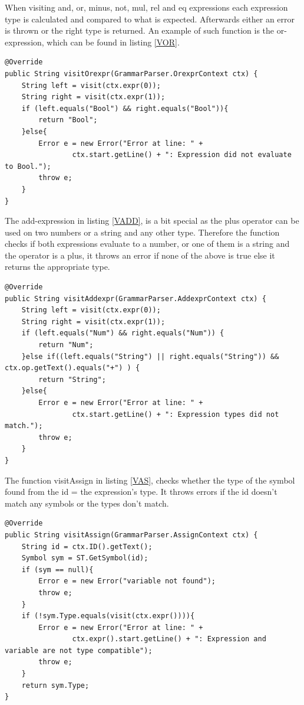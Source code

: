 When visiting and, or, minus, not, mul, rel and eq expressions each expression type is calculated and compared to what is expected. Afterwards either an error is thrown or the right type is returned. An example of such function is the or-expression, which can be found in listing \ref{VOR}.

\begin{lstlisting}[caption={SymbolTypeVisitor - visitOrexpr function}, label={VOR}]
@Override
public String visitOrexpr(GrammarParser.OrexprContext ctx) {
    String left = visit(ctx.expr(0));
    String right = visit(ctx.expr(1));
    if (left.equals("Bool") && right.equals("Bool")){
        return "Bool";
    }else{
        Error e = new Error("Error at line: " +
                ctx.start.getLine() + ": Expression did not evaluate to Bool.");
        throw e;
    }
}
\end{lstlisting}

The add-expression in listing \ref{VADD}, is a bit special as the plus operator can be used on two numbers or a string and any other type. Therefore the function checks if both expressions evaluate to a number, or one of them is a string and the operator is a plus, it throws an error if none of the above is true else it returns the appropriate type. 

\begin{lstlisting}[caption={SymbolTypeVisitor - visitAddexpr function}, label={VADD}]
@Override
public String visitAddexpr(GrammarParser.AddexprContext ctx) {
    String left = visit(ctx.expr(0));
    String right = visit(ctx.expr(1));
    if (left.equals("Num") && right.equals("Num")) {
        return "Num";
    }else if((left.equals("String") || right.equals("String")) && ctx.op.getText().equals("+") ) {
        return "String";
    }else{
        Error e = new Error("Error at line: " +
                ctx.start.getLine() + ": Expression types did not match.");
        throw e;
    }
}
\end{lstlisting}

The function visitAssign in listing \ref{VAS}, checks whether the type of the symbol found from the id = the expression's type. It throws errors if the id doesn't match any symbols or the types don't match. 

\begin{lstlisting}[caption={SymbolTypeVisitor - visitAssign function}, label={VAS}]
@Override
public String visitAssign(GrammarParser.AssignContext ctx) {
    String id = ctx.ID().getText();
    Symbol sym = ST.GetSymbol(id);
    if (sym == null){
        Error e = new Error("variable not found");
        throw e;
    }
    if (!sym.Type.equals(visit(ctx.expr()))){
        Error e = new Error("Error at line: " +
                ctx.expr().start.getLine() + ": Expression and variable are not type compatible");
        throw e;
    }
    return sym.Type;
}
\end{lstlisting}


